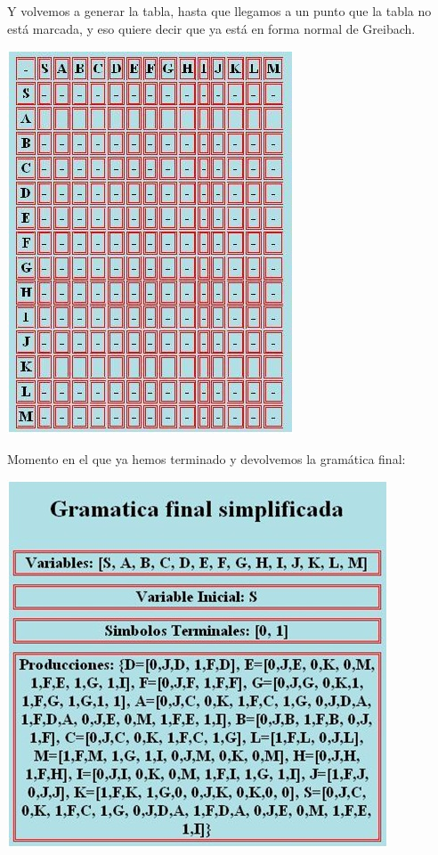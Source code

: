 \documentclass[12pt,a4paper,spanish]{book}
\begin{document}
Y volvemos a generar la tabla, hasta que llegamos a un punto que la tabla no est\'a marcada, y eso quiere decir que ya est\'a en forma normal de Greibach.\\
\newline

\begin{center}
\includegraphics[scale=0.6]{gram4.jpg}\\
\end{center}


Momento en el que ya hemos terminado y devolvemos la gram\'atica final:\\
\newline
\begin{center}
\includegraphics[scale=0.6]{gram5.jpg}\\
\end{center}
\end{document}
